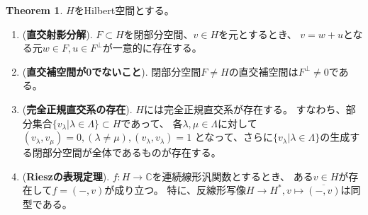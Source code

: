 \documentclass[uplatex]{jsarticle}
\theoremstyle{definition}
\newtheorem{thm}{Theorem}[section]
\newcommand{\C}{\mathbb{C}}
\begin{document}
\begin{thm}
  \(H\)をHilbert空間とする。
  \begin{enumerate}
    \item \label{elem decomp}
    (\textbf{直交射影分解}).
    \(F\subset H\)を閉部分空間、\(v\in H\)を元とするとき、
    \(v=w+u\)となる元\(w\in F, u\in F^{\bot}\)が一意的に存在する。
    \item \label{orthog not 0}
    (\textbf{直交補空間が0でないこと}).
    閉部分空間\(F\neq H\)の直交補空間は\(F^{\bot}\neq 0\)である。
    \item \label{exists onb}
    (\textbf{完全正規直交系の存在}).
    \(H\)には完全正規直交系が存在する。
    すなわち、部分集合\(\{v_{\lambda}|\lambda\in \Lambda\}\subset H\)であって、
    各\(\lambda,\mu\in \Lambda\)に対して
    \((v_{\lambda},v_{\mu}) = 0, (\lambda\neq \mu), (v_{\lambda},v_{\lambda}) = 1\)
    となって、さらに\(\{v_{\lambda}|\lambda\in \Lambda\}\)の生成する閉部分空間が全体であるものが存在する。
    \item \label{Riesz rep}
    (\textbf{Rieszの表現定理}).
    \(f:H\to \C\)を連続線形汎関数とするとき、
    ある\(v\in H\)が存在して\(f = (-,v)\)が成り立つ。
    特に、反線形写像\(H\to H^*,v\mapsto \overline{(-,v)}\)は同型である。
  \end{enumerate}
\end{thm}
\end{document}
